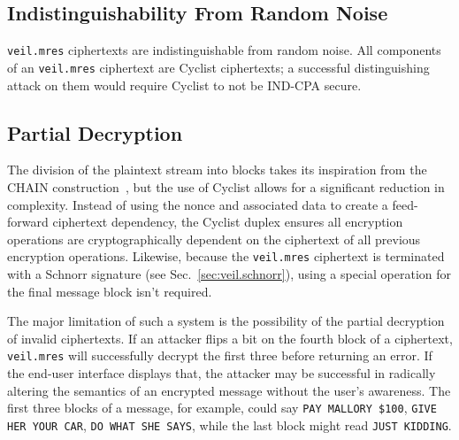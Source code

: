\subsection{Indistinguishability From Random Noise}\label{subsec:veil.mres-indistinguishability}

\texttt{veil.mres} ciphertexts are indistinguishable from random noise.
All components of an \texttt{veil.mres} ciphertext are Cyclist ciphertexts;
a successful distinguishing attack on them would require Cyclist to not be IND-CPA secure.

\subsection{Partial Decryption}\label{subsec:veil.mres-partial-decryption}

The division of the plaintext stream into blocks takes its inspiration from the CHAIN construction~\cite{hoang2015}\@,
but the use of Cyclist allows for a significant reduction in complexity.
Instead of using the nonce and associated data to create a feed-forward ciphertext dependency, the Cyclist duplex
ensures all encryption operations are cryptographically dependent on the ciphertext of all previous encryption
operations.
Likewise, because the \texttt{veil.mres} ciphertext is terminated with a Schnorr signature (see
Sec.~\ref{sec:veil.schnorr}), using a special operation for the final message block isn't required.

The major limitation of such a system is the possibility of the partial decryption of invalid ciphertexts.
If an attacker flips a bit on the fourth block of a ciphertext, \texttt{veil.mres} will successfully decrypt the first
three before returning an error.
If the end-user interface displays that, the attacker may be successful in radically altering the semantics of an
encrypted message without the user's awareness.
The first three blocks of a message, for example, could say \texttt{PAY MALLORY \$100}, \texttt{GIVE HER YOUR CAR},
\texttt{DO WHAT SHE SAYS}, while the last block might read \texttt{JUST KIDDING}\@.
